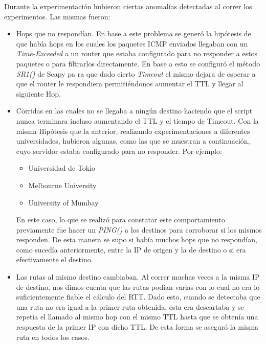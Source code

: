 Durante la experimentación hubieron ciertas anomalías detectadas al correr los experimentos. Las mismas fueron:

\begin{itemize}
    \item Hops que no respondían. En base a este problema se generó la hipótesis de que había hops en los cuales los paquetes ICMP enviados llegaban con un \textit{Time-Exceeded} a un router que estaba configurado para no responder a estos paquetes o para filtrarlos directamente. En base a esto se configuró el método \textit{SR1()} de Scapy pa ra que dado cierto \textit{Timeout} el mismo dejara de esperar a que el router le respondiera permitiéndonos aumentar el TTL y llegar al siguiente Hop.
    \item Corridas en las cuales no se llegaba a ningún destino haciendo que el script nunca terminara incluso aumentando el TTL y el tiempo de Timeout. Con la misma Hipótesis que la anterior, realizando experimentaciones a diferentes universidades, hubieron algunas, como las que se muestran a continuación, cuyo servidor estaba configurado para no responder. Por ejemplo:
    \begin{itemize}
        \item Universidad de Tokio
        \item Melbourne University
        \item University of Mumbay
    \end{itemize}
    En este caso, lo que se realizó para constatar este comportamiento previamente fue hacer un \textit{PING()} a los destinos para corroborar si los mismos responden. De esta manera se supo si había muchos hops que no respondían, como sucedía anteriormente, entre la IP de origen y la de destino o si era efectivamente el destino.
    \item Las rutas al mismo destino cambiaban. Al correr muchas veces a la misma IP de destino, nos dimos cuenta que las rutas podían varias con lo cual no era lo suficientemente fiable el cálculo del RTT. Dado esto, cuando se detectaba que una ruta no era igual a la primer ruta obtenida, esta era descartaba y se repetía el llamado al mismo hop con el mismo TTL hasta que se obtenía una respuesta de la primer IP con dicho TTL. De esta forma se aseguró la misma ruta en todos los casos.

\end{itemize}
